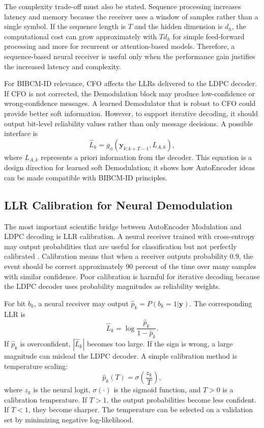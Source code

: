 The complexity trade-off must also be stated. Sequence processing increases latency and memory because the receiver uses a window of samples rather than a single symbol. If the sequence length is $T$ and the hidden dimension is $d_h$, the computational cost can grow approximately with $T d_h$ for simple feed-forward processing and more for recurrent or attention-based models. Therefore, a sequence-based neural receiver is useful only when the performance gain justifies the increased latency and complexity.

For BIBCM-ID relevance, CFO affects the LLRs delivered to the LDPC decoder. If CFO is not corrected, the Demodulation block may produce low-confidence or wrong-confidence messages. A learned Demodulator that is robust to CFO could provide better soft information. However, to support iterative decoding, it should output bit-level reliability values rather than only message decisions. A possible interface is
\begin{equation}
  \hat{L}_k=g_\phi(\mathbf{y}_{k:k+T-1},L_{A,k}),
\end{equation}
where $L_{A,k}$ represents a priori information from the decoder. This equation is a design direction for learned soft Demodulation; it shows how AutoEncoder ideas can be made compatible with BIBCM-ID principles.

\subsection{LLR Calibration for Neural Demodulation}
The most important scientific bridge between AutoEncoder Modulation and LDPC decoding is LLR calibration. A neural receiver trained with cross-entropy may output probabilities that are useful for classification but not perfectly calibrated \cite{guo2017}. Calibration means that when a receiver outputs probability $0.9$, the event should be correct approximately 90 percent of the time over many samples with similar confidence. Poor calibration is harmful for iterative decoding because the LDPC decoder uses probability magnitudes as reliability weights.

For bit $b_k$, a neural receiver may output $\hat{p}_k=P(b_k=1|\mathbf{y})$. The corresponding LLR is
\begin{equation}
  \hat{L}_k=\log\frac{\hat{p}_k}{1-\hat{p}_k}.
\end{equation}
If $\hat{p}_k$ is overconfident, $|\hat{L}_k|$ becomes too large. If the sign is wrong, a large magnitude can mislead the LDPC decoder. A simple calibration method is temperature scaling:
\begin{equation}
  \hat{p}_k(T)=\sigma\left(\frac{z_k}{T}\right),
\end{equation}
where $z_k$ is the neural logit, $\sigma(\cdot)$ is the sigmoid function, and $T>0$ is a calibration temperature. If $T>1$, the output probabilities become less confident. If $T<1$, they become sharper. The temperature can be selected on a validation set by minimizing negative log-likelihood.

